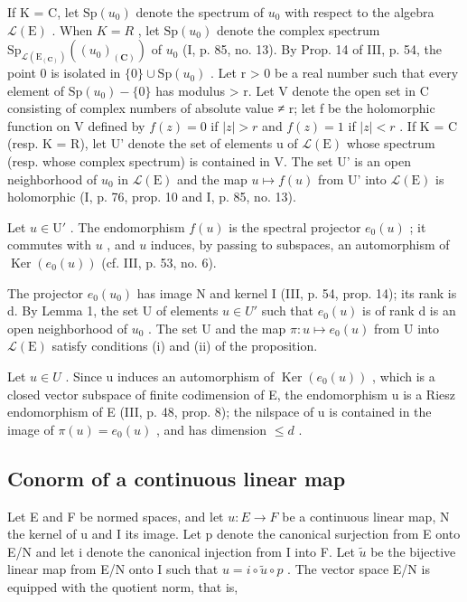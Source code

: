 If K = C, let \(\mathrm{Sp}(u_{0})\) denote the spectrum of \(u_{0}\) with respect to the algebra \(\mathcal{L}(\mathrm{E})\) . When \(K = R\) , let \(\mathrm{Sp}(u_{0})\) denote the complex spectrum \(\mathrm{Sp}_{\mathcal{L}(\mathrm{E}_{(\mathbf{C})})}((u_{0})_{(\mathbf{C})})\) of \(u_{0}\) (I, p. 85, no. 13). By Prop. 14 of III, p. 54, the point 0 is isolated in \(\{0\} \cup \mathrm{Sp}(u_{0})\) . Let r \textgreater{} 0 be a real number such that every element of \(\mathrm{Sp}(u_{0}) - \{0\}\) has modulus \textgreater{} r. Let V denote the open set in C consisting of complex numbers of absolute value ≠ r; let f be the holomorphic function on V defined by \(f(z) = 0\) if \(|z| > r\) and \(f(z) = 1\) if \(|z| < r\) . If K = C (resp. K = R), let U' denote the set of elements u of \(\mathcal{L}(\mathrm{E})\) whose spectrum (resp. whose complex spectrum) is contained in V. The set U' is an open neighborhood of \(u_{0}\) in \(\mathcal{L}(\mathrm{E})\) and the map \(u \mapsto f(u)\) from U' into \(\mathcal{L}(\mathrm{E})\) is holomorphic (I, p. 76, prop. 10 and I, p. 85, no. 13).

Let \(u \in \mathrm{U}'\) . The endomorphism \(f(u)\) is the spectral projector \(e_0(u)\) ; it commutes with \(u\) , and \(u\) induces, by passing to subspaces, an automorphism of \(\operatorname{Ker}(e_0(u))\) (cf. III, p. 53, no. 6).

The projector \(e_{0}(u_{0})\) has image N and kernel I (III, p. 54, prop. 14); its rank is d. By Lemma 1, the set U of elements \(u \in U'\) such that \(e_{0}(u)\) is of rank d is an open neighborhood of \(u_{0}\) . The set U and the map \(\pi: u \mapsto e_{0}(u)\) from U into \(\mathcal{L}(\mathrm{E})\) satisfy conditions (i) and (ii) of the proposition.

Let \(u \in U\) . Since u induces an automorphism of \(\operatorname{Ker}(e_{0}(u))\) , which is a closed vector subspace of finite codimension of E, the endomorphism u is a Riesz endomorphism of E (III, p. 48, prop. 8); the nilspace of u is contained in the image of \(\pi(u) = e_{0}(u)\) , and has dimension \(\leqslant d\) .

\subsection{Conorm of a continuous linear map}

Let E and F be normed spaces, and let \(u: E \rightarrow F\) be a continuous linear map, N the kernel of u and I its image. Let p denote the canonical surjection from E onto E/N and let i denote the canonical injection from I into F. Let \(\widetilde{u}\) be the bijective linear map from E/N onto I such that \(u = i \circ \widetilde{u} \circ p\) . The vector space E/N is equipped with the quotient norm, that is,

